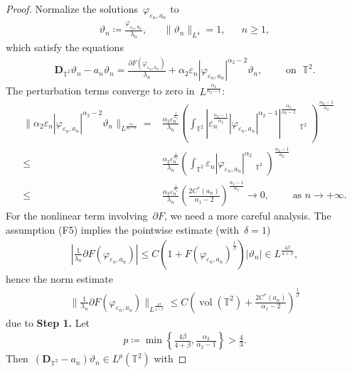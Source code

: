 \documentclass[11pt,final]{amsart}
\newcommand{\p}{\partial}
\newcommand{\T}{\mathbb{T}}
\newcommand{\dd}{\mathop{}\!\mathrm{d}}
\newcommand{\eps}{\varepsilon}
\newcommand{\pD}{\mathbf{D}}
\newcommand{\parenthesis}[1]{\left(#1\right)} %
\newcommand{\braces}[1]{\left\{#1\right\}} %
\DeclareMathOperator{\dv}{\dd{vol}}
\DeclareMathOperator{\vol}{vol}
\begin{document}
\begin{proof}
Normalize the solutions~$\varphi_{\eps_n,a_n}$ to
\begin{align}
    \vartheta_n\coloneqq \frac{\varphi_{\eps_n,a_n}}{\lambda_n}, & & \|\vartheta_n\|_{L^4}=1, & & n\geq 1,
\end{align}
which satisfy the equations
\begin{align}\label{eq:normalized eqn}
    \pD_{\T^2}\vartheta_n-a_n\vartheta_n=\frac{\p F(\varphi_{\eps_n,a_n})}{\lambda_n} + \alpha_2\eps_n |\varphi_{\eps_n,a_n}|^{\alpha_2 -2 }\vartheta_n, \qquad \mbox{ on } \; \mathbb{T}^2.
\end{align}
The perturbation terms converge to zero in~$L^{\frac{\alpha_2}{\alpha_2-1}}$:
\begin{align}
    \|\alpha_2\eps_n |\varphi_{\eps_n,a_n}|^{\alpha_2 -2 }\vartheta_n \|_{L^{\frac{\alpha_2}{\alpha_2 -1}}}
    = & \frac{\alpha_2 \eps_n^{\frac{1}{\alpha_2}} }{\lambda_n}
     \parenthesis{ \int_{\mathbb{T}^2} \left|\eps_n^{\frac{\alpha_2-1}{\alpha_2}} |\varphi_{\eps_n,a_n}|^{\alpha_2 -1} \right|^{\frac{\alpha_2}{\alpha_2-1}} \dv_{\T^2}   }^{\frac{\alpha_2-1}{\alpha_2}}\\
    \leq& \frac{\alpha_2 \eps_n^{\frac{1}{\alpha_2}} }{\lambda_n}
    \parenthesis{ \int_{\mathbb{T}^2} \eps_n |\varphi_{\eps_n,a_n}|^{\alpha_2}\dv_{\T^2}}^{\frac{\alpha_2-1}{\alpha_2}} \\
    \leq& \frac{\alpha_2 \eps_n^{\frac{1}{\alpha_2}} }{\lambda_n}\parenthesis{ \frac{2C^*(a_n)}{\alpha_1-2} }^{\frac{\alpha_2-1}{\alpha_2}} \to 0 ,\qquad \mbox{ as } n\to+\infty. 
\end{align}
For the nonlinear term involving~$\p F$, we need a more careful analysis.
The assumption (F5) implies the pointwise estimate (with~$\delta=1$)
\begin{align}
    \left|\frac{1}{\lambda_n} \p F(\varphi_{\eps_n,a_n})\right|
    \leq C \parenthesis{1+ F(\varphi_{\eps_n,a_n})^{\frac{1}{\beta}}} |\vartheta_n| \in L^{\frac{4\beta}{4+\beta}},
\end{align}
hence the norm estimate
\begin{align}
    \|\frac{1}{\lambda_n}\p F(\varphi_{\eps_n,a_n})\|_{L^{\frac{4\beta}{4+\beta}}}
    \leq C \parenthesis{ \vol(\mathbb{T}^2)+\frac{2 C^*(a_n)}{\alpha_1-2} }^{\frac{1}{\beta}}
\end{align}
due to \noindent\textbf{Step 1.}
Let 
\begin{align}
    p\coloneqq \min\braces{ \frac{4\beta}{4+\beta}, \frac{\alpha_2}{\alpha_2-1} } >\frac{4}{3}. 
\end{align}
Then~$ (\pD_{\T^2}-a_n)\vartheta_n \in L^p(\mathbb{T}^2)$ with

\end{proof}
\end{document}
